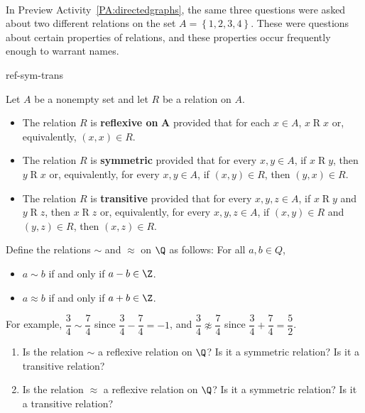 \begin{previewactivity} \label{PA:propsofrelaitons} \hfill \\
In Preview Activity~\ref{PA:directedgraphs}, the same three questions were asked about two different relations on the set $A = \left\{ {1, 2, 3, 4} \right\}$.  These were questions about certain properties of relations, and these properties occur frequently enough to warrant names.

\begin{defbox}{ref-sym-trans}{Let  $A$  be a nonempty set and let  $R$  be a relation on  $A$.
\begin{itemize}
\item The relation  $R$  is \textbf{reflexive on}
%
%
 $\boldsymbol{A}$  provided that for each  
$x \in A$,  $x \mathrel{R} x$ or, equivalently,  $\left( {x, x} \right) \in R$.

\item The relation  $R$  is \textbf{symmetric}
%
%
  provided that for every  $x, y \in A$,  if  
$x \mathrel{R} y$, then  $y \mathrel{R} x$ or, equivalently, for every  $x, y \in A$,  if  $\left( {x, y} \right) \in R$, then  $\left( {y, x} \right) \in R$.

\item The relation  $R$  is \textbf{transitive}
%
%
  provided that for every $x, y, z \in A$,  if  $x \mathrel{R} y$ and  $y \mathrel{R} z$, then  $x \mathrel{R} z$ or, equivalently, for every  $x, y, z \in A$,  if  $\left( {x, y} \right) \in R$ and $\left( {y, z} \right) \in R$, then  $\left( {x, z} \right) \in R$.
\end{itemize}
}
\end{defbox}

\noindent
Define the relations  $\sim$  and  $ \approx $  on  $\Q$  as follows:  For all $a, b \in Q$,
\begin{itemize}
\item $a \sim b$  if and only if  $a - b \in \Z $.	

\item $a \approx b$  if and only if  $a + b \in \Z$.
\end{itemize}

\noindent
For example, $\dfrac{3}{4} \sim \dfrac{7}{4}$ since $\dfrac{3}{4} - \dfrac{7}{4} = -1$, and 
$\dfrac{3}{4} \not  \approx \dfrac{7}{4}$ since $\dfrac{3}{4} + \dfrac{7}{4} = \dfrac{5}{2}$.

\begin{enumerate}
\item Is the relation  $\sim$  a reflexive relation on  $\Q$?  Is it a symmetric relation?  Is it a transitive relation? 

\item Is the relation  $ \approx $  a reflexive relation on  $\Q$?  Is it a symmetric relation?  Is it a transitive relation?
\end{enumerate}
\end{previewactivity}
